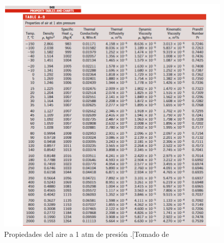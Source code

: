 \documentclass[12pt,letterpaper]{article}     %
\begin{document}
\begin{figure}[H]
\centering
\includegraphics[width=1.2\textwidth]{proprtiies1.png}
\caption{Propiedades del aire a 1 atm de presión .[Tomado de \cite[p\ 1006]{yunus}}
\label{fig:propiedadesaire}
\end{figure}

\newpage

\end{document}
